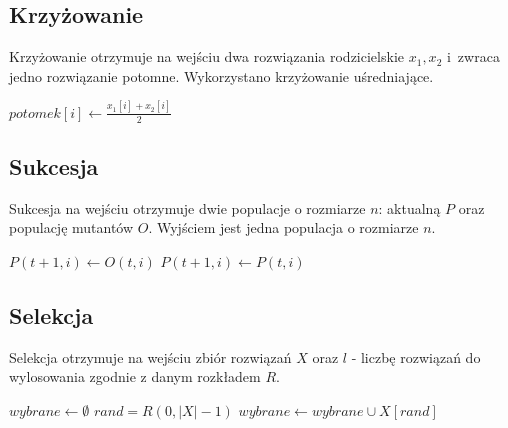 \documentclass[12pt, a4paper]{article}
\begin{document}
\subsection{Krzyżowanie}

Krzyżowanie otrzymuje na wejściu dwa rozwiązania rodzicielskie $x_1,x_2$ i~zwraca jedno rozwiązanie potomne. 
Wykorzystano krzyżowanie uśredniające.

\begin{algorithm}[!htb]
\begin{algorithmic}[1]
    \State $potomek[i] \gets \frac{x_1[i] + x_2[i]}{2}$
  \EndFor
\EndFunction
\end{algorithmic}
\end{algorithm}

\subsection{Sukcesja}

Sukcesja na wejściu otrzymuje dwie populacje o rozmiarze $n$: aktualną $P$ oraz populację mutantów $O$.
Wyjściem jest jedna populacja o rozmiarze $n$.

\begin{algorithm}[!htb]
\begin{algorithmic}[1]
      \State $P(t+1, i) \gets O(t, i)$
    \Else
      \State $P(t+1, i) \gets P(t, i)$
    \EndIf
  \EndFor
\EndFunction
\end{algorithmic}
\end{algorithm}

\subsection{Selekcja}

Selekcja otrzymuje na wejściu zbiór rozwiązań $X$ oraz $l$ - liczbę rozwiązań do wylosowania zgodnie z danym rozkładem $R$.

\begin{algorithm}[!htb]
\begin{algorithmic}[1]
  \State $wybrane \gets \emptyset$
    \State $rand = R(0, |X| - 1)$
    \State $wybrane \gets wybrane \cup X[rand]$
  \EndFor
\EndFunction
\end{algorithmic}
\end{algorithm}
\end{document}
